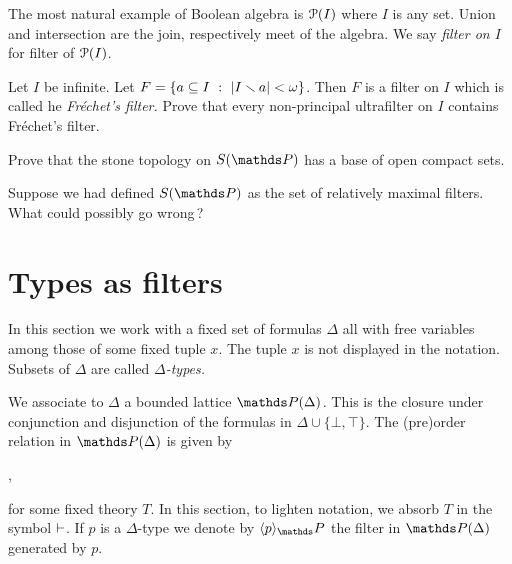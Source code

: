 The most natural example of Boolean algebra is $\P(I)$ where $I$ is any set.
Union and intersection are the join, respectively meet of the algebra.
We say \emph{filter on $I$\/} for filter of $\P(I)$.

\begin{exercise}
  Let $I$ be infinite.
  Let $F=\{a\subseteq I\ :\ |I\sm a|<\omega\}$.
  Then $F$ is a filter on $I$ which is called he \emph{Fr\'echet's filter.}
  Prove that every non-principal ultrafilter on $I$ contains Fr\'echet's filter.
\end{exercise}
  

\begin{exercise}
Prove that the stone topology on $S(\PP)$ has a base of open compact sets.
\end{exercise}

\begin{exercise}
Suppose we had defined $S(\PP)$ as the set of relatively maximal filters.
What could possibly go wrong\,?
\end{exercise}


\section{Types as filters}\label{frammenti}

In this section we work with a fixed set of formulas \emph{$\Delta$\/} all with free variables among those of some fixed tuple $x$.
The tuple $x$ is not displayed in the notation.
Subsets of $\Delta$ are called \emph{$\Delta$-types.}

We associate to $\Delta$ a bounded lattice \emph{$\PP(\Delta)$.}
This is the closure under conjunction and disjunction of the formulas in $\Delta\cup\{\bot,\top\}$.
The (pre)order relation in $\PP(\Delta)$ is given by

,

for some fixed theory $T$.
In this section, to lighten notation, we absorb $T$ in the symbol $\proves$.
If $p$ is a $\Delta$-type we denote by $\<p\>_\PP$ the filter in $\PP(\Delta)$ generated by $p$.

